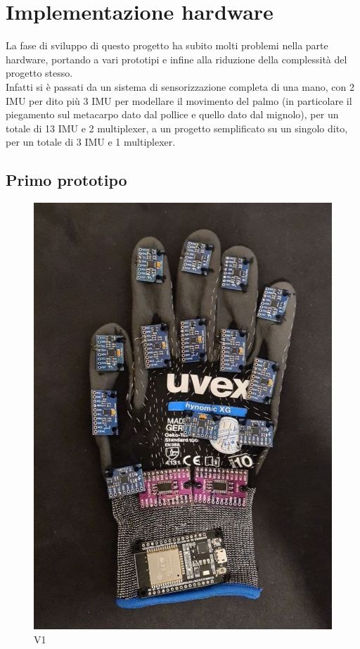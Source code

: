 \section{Implementazione hardware}

La fase di sviluppo di questo progetto ha subito molti problemi nella parte hardware, portando a vari prototipi e infine alla riduzione della complessità del progetto stesso.\\

Infatti si è passati da un sistema di sensorizzazione completa di una mano, con 2 IMU per dito più 3 IMU per modellare il movimento del palmo (in particolare il piegamento sul metacarpo dato dal pollice e quello dato dal mignolo), per un totale di 13 IMU e 2 multiplexer, a un progetto semplificato su un singolo dito, per un totale di 3 IMU e 1 multiplexer.

\subsection{Primo prototipo}

\begin{figure}[H]
    \includegraphics[scale=0.35]{immagini/prototipo1.jpg}
    \centering
    \caption{V1}
\end{figure}


